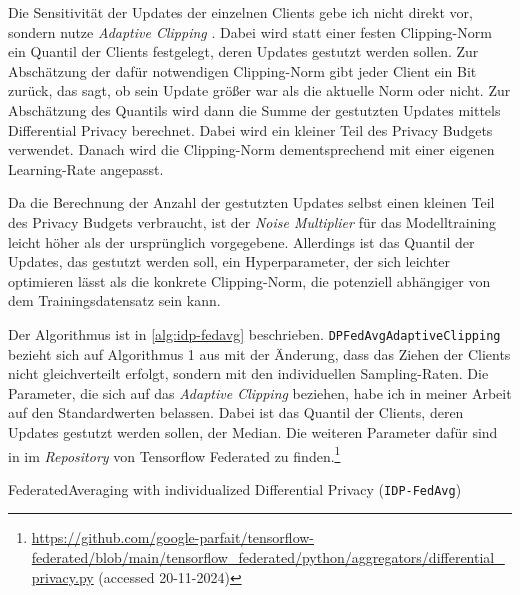 Die Sensitivität der Updates der einzelnen Clients gebe ich nicht direkt vor, sondern nutze \textit{Adaptive Clipping} \cite{andrew:2021}. Dabei wird statt einer festen Clipping-Norm ein Quantil der Clients festgelegt, deren Updates gestutzt werden sollen. Zur Abschätzung der dafür notwendigen Clipping-Norm gibt jeder Client ein Bit zurück, das sagt, ob sein Update größer war als die aktuelle Norm oder nicht. Zur Abschätzung des Quantils wird dann die Summe der gestutzten Updates mittels Differential Privacy berechnet. Dabei wird ein kleiner Teil des Privacy Budgets verwendet. Danach wird die Clipping-Norm dementsprechend mit einer eigenen Learning-Rate angepasst. 

Da die Berechnung der Anzahl der gestutzten Updates selbst einen kleinen Teil des Privacy Budgets verbraucht, ist der \textit{Noise Multiplier} für das Modelltraining leicht höher als der ursprünglich vorgegebene. Allerdings ist das Quantil der Updates, das gestutzt werden soll, ein Hyperparameter, der sich leichter optimieren lässt als die konkrete Clipping-Norm, die potenziell abhängiger von dem Trainingsdatensatz sein kann.

Der Algorithmus ist in \autoref{alg:idp-fedavg} beschrieben. \texttt{DPFedAvgAdaptiveClipping} bezieht sich auf Algorithmus 1 aus \textcite[p.4]{andrew:2021} mit der Änderung, dass das Ziehen der Clients nicht gleichverteilt erfolgt, sondern mit den individuellen Sampling-Raten. Die Parameter, die sich auf das \textit{Adaptive Clipping} beziehen, habe ich in meiner Arbeit auf den Standardwerten belassen. Dabei ist das Quantil der Clients, deren Updates gestutzt werden sollen, der Median. Die weiteren Parameter dafür sind in im \textit{Repository} von Tensorflow Federated zu finden.\footnote{\url{https://github.com/google-parfait/tensorflow-federated/blob/main/tensorflow_federated/python/aggregators/differential_privacy.py} (accessed 20-11-2024)}


\begin{algorithm}[tb]
	\caption{FederatedAveraging with individualized Differential Privacy (\texttt{IDP-FedAvg})}
	\label{alg:idp-fedavg}
\end{algorithm}
